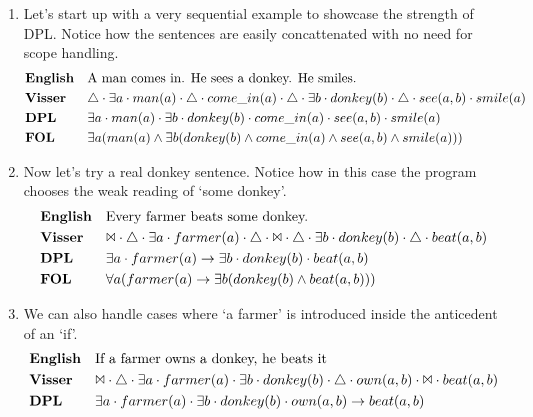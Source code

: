 \documentclass[12pt]{article}
\begin{document}
\begin{enumerate}
\item
Let's start up with a very sequential example to showcase the strength of DPL. Notice how the sentences are easily concattenated with no need for scope handling.
\begin{align*}
&\text{\textbf{English}}&&\text{A man comes in. He sees a donkey. He smiles.} \\
&\text{\textbf{Visser}}&&\triangle \cdot \exists a \cdot man(a) \cdot \triangle \cdot come\_in(a) \cdot \triangle \cdot \exists b \cdot donkey(b) \cdot \triangle \cdot see(a,b) \cdot smile(a) \\
&\text{\textbf{DPL}}&&\exists a \cdot man(a) \cdot \exists b \cdot donkey(b) \cdot come\_in(a) \cdot see(a,b) \cdot smile(a) \\
&\text{\textbf{FOL}}&&\exists a(man(a) \wedge \exists b(donkey(b) \wedge come\_in(a) \wedge see(a,b) \wedge smile(a))) \\
\end{align*}
\item
Now let's try a real donkey sentence. Notice how in this case the program chooses the weak reading of `some donkey'.
\begin{align*}
&\text{\textbf{English}}&&\text{Every farmer beats some donkey.} \\
&\text{\textbf{Visser}}&&\Bowtie \cdot \triangle \cdot \exists a \cdot farmer(a) \cdot \triangle \cdot \Bowtie \cdot \triangle \cdot \exists b \cdot donkey(b) \cdot \triangle \cdot beat(a,b) \\
&\text{\textbf{DPL}}&&\exists a \cdot farmer(a) \rightarrow \exists b \cdot donkey(b) \cdot beat(a,b) \\
&\text{\textbf{FOL}}&&\forall a(farmer(a) \rightarrow \exists b(donkey(b) \wedge beat(a,b))) \\
\end{align*}
\item
We can also handle cases where `a farmer' is introduced inside the anticedent of an `if'.
\begin{align*}
&\text{\textbf{English}}&&\text{If a farmer owns a donkey, he beats it} \\
&\text{\textbf{Visser}}&&\Bowtie \cdot \triangle \cdot \exists a \cdot farmer(a) \cdot \exists b \cdot donkey(b) \cdot \triangle \cdot own(a,b) \cdot \Bowtie \cdot beat(a,b) \\
&\text{\textbf{DPL}}&&\exists a \cdot farmer(a) \cdot \exists b \cdot donkey(b) \cdot own(a,b) \rightarrow beat(a,b) \\

\end{align*}
\end{enumerate}
\end{document}
